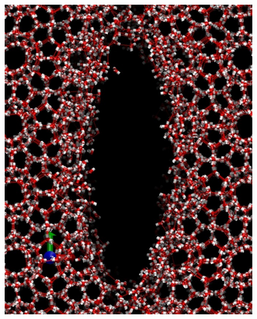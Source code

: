 \begin{figure}
\begin{minipage}[b]{0.24\linewidth}
{\includegraphics[width=\linewidth]{../pictures/snapshots_1045_280K/t_600000.pdf}}
\end{minipage}
\begin{minipage}[b]{0.24\linewidth}
\end{minipage}
\end{figure}

